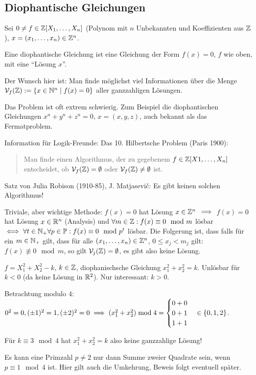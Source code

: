 \documentclass[a4paper,twoside,DIV15,BCOR12mm]{scrbook}
\begin{document}
\subsection{Diophantische Gleichungen}
Sei $0\ne f \in \mathbb{Z}[X_1,\ldots,X_n]$ (Polynom mit $n$ Unbekannten
und Koeffizienten aus $\mathbb{Z}$), $x=(x_1,\ldots,x_n)\in\mathbb{Z}^n$.

Eine diophantische Gleichung ist eine Gleichung der Form $f(x)=0$,
$f$ wie oben, mit eine "`Lösung $x$"'.

Der Wunsch hier ist: Man finde möglichst viel Informationen über die
Menge $\mathcal{V}_f(\mathbb{Z}) := \{ x\in\mathbb{N}^n \mid f(x) = 0\}$ aller
ganzzahligen Lösungen.

Das Problem ist oft extrem schwierig. Zum Beispiel die
diophantischen Gleichungen $x^n+y^n+z^n=0$, $x=(x,y,z)$, auch
bekannt als das Fermatproblem.

Information für Logik-Freunde: Das 10. Hilbertsche Problem (Paris
1900):
\begin{quote}
Man finde einen Algorithmus, der zu gegebenem $f\in
\mathbb{Z}[X1,\ldots,X_n]$ entscheidet, ob $\mathcal{V}_f(\mathbb{Z}) =
\emptyset$ oder $\mathcal{V}_f(\mathbb{Z}) \ne \emptyset$ ist.
\end{quote}
Satz von Julia Robison (1910-85), J. Matjasevi\v{c}: Es gibt keinen
solchen Algorithmus!

Triviale, aber wichtige Methode: $f(x)=0$ hat Lösung $x\in\mathbb{Z}^n$
$\implies$ $f(x)=0$ hat Lösung $x \in \mathbb{R}^n$ (Analysis) und $\forall
m \in \mathbb{Z}: f(x) \equiv 0 \mod m$ lösbar $\iff \forall t \in \mathbb{N}_+
\forall p\in\mathbb{P}: f(x) \equiv 0 \mod p^t$ lösbar. Die Folgerung ist,
dass falls für ein $m\in\mathbb{N}_+$ gilt, dass für alle
$(x_1,\ldots,x_n)\in\mathbb{Z}^n$, $0\le x_j < m_j$ gilt: $f(x)\not\equiv
0 \mod m$, so gilt $\mathcal{V}_j(\mathbb{Z})= \emptyset$, es gibt also
keine Lösung.

\begin{beispiel}
$f=X_1^2 + X_2^2 - k$, $k\in\mathbb{Z}$, diophanischsche Gleichung $x_1^2
+ x_2^2 = k$. Unlösbar für $k<0$ (da keine Lösung in $\mathbb{R}^2$). Nur
interessant: $k>0$.

Betrachtung modulo 4:\\ $0^2 = 0, (\pm1)^2 = 1, (\pm2)^2= 0 \implies
(x_1^2 + x_2^2) \bmod 4 =
\begin{cases}
0+0 \\ 0+1 \\ 1+1
\end{cases} \in \{0,1,2\}$.

Für $k\equiv 3 \mod 4$ hat $x_1^2 + x_2^2 = k$ also keine
ganzzahlige Lösung!

Es kann eine Primzahl $p\ne 2$ nur dann Summe zweier Quadrate sein,
wenn $p\equiv 1 \mod 4$ ist. Hier gilt auch die Umkehrung, Beweis
folgt eventuell später.
\end{beispiel}
\end{document}
